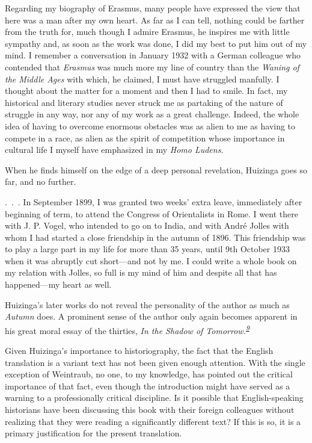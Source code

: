 Regarding my biography of Erasmus, many people have expressed the view
that here was a man after my own heart. As far as I can tell, nothing
could be farther from the truth for, much though I admire Erasmus, he
inspires me with little sympathy and, as soon as the work was done, I
did my best to put him out of my mind. I remember a conversation in
January 1932 with a German colleague who contended that \emph{Erasmus}
was much more my line of country than the \emph{Waning of the Middle
Ages} with which, he claimed, I must have struggled manfully. I thought
about the matter for a moment and then I had to smile. In fact, my
historical and literary studies never struck me as partaking of the
nature of struggle in any way, nor any of my work as a great challenge.
Indeed, the whole idea of having to overcome enormous obstacles was as
alien to me as having to compete in a
\protect\hypertarget{05_TRANSLATOR_S_INTRODUCTION.xhtmlux5cux23page_xiii}{}{}race,
as alien as the spirit of competition whose importance in cultural life
I myself have emphasized in my \emph{Homo Ludens}.

When he finds himself on the edge of a deep personal revelation,
Huizinga goes so far, and no further.

.~.~. In September 1899, I was granted two weeks' extra leave,
immediately after beginning of term, to attend the Congress of
Orientalists in Rome. I went there with J. P. Vogel, who intended to go
on to India, and with André Jolles with whom I had started a close
friendship in the autumn of 1896. This friendship was to play a large
part in my life for more than 35 years, until 9th October 1933 when it
was abruptly cut short---and not by me. I could write a whole book on my
relation with Jolles, so full is my mind of him and despite all that has
happened---my heart as well.

Huizinga's later works do not reveal the personality of the author as
much as \emph{Autumn} does. A prominent sense of the author only again
becomes apparent in his great moral essay of the thirties, \emph{In the
Shadow of
Tomorrow.\textsuperscript{\protect\hypertarget{05_TRANSLATOR_S_INTRODUCTION.xhtmlux5cux23id_2231}{\protect\hyperlink{23_NOTES.xhtmlux5cux23id_2232}{9}}}}

Given Huizinga's importance to historiography, the fact that the English
translation is a variant text has not been given enough attention. With
the single exception of Weintraub, no one, to my knowledge, has pointed
out the critical importance of that fact, even though the introduction
might have served as a warning to a professionally critical discipline.
Is it possible that English-speaking historians have been discussing
this book with their foreign colleagues without realizing that they were
reading a significantly different text? If this is so, it is a primary
justification for the present translation.

